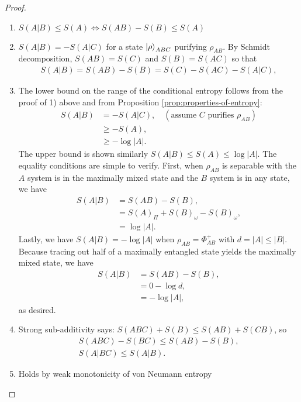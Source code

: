 \documentclass[notoc]{tufte-book}
\begin{document}
\begin{proof}
\begin{enumerate}
    \item $S(A|B) \leq S(A) \Leftrightarrow S(AB)-S(B)\leq S(A) $
    \item $S(A|B) =-S(A|C)$ for a state $\ket{\rho}_{ABC}$ purifying $\rho_{AB}$. By Schmidt decomposition, $S(AB)=S(C)$ and $S(B)=S(AC)$ so that 
    \begin{align}
        S(A|B) =S(AB)-S(B) =S(C)-S(AC)-S(A|C),
    \end{align}
    \item The lower bound on the range of the conditional entropy follows from the proof of 1) above and from Proposition \ref{prop:properties-of-entropy}:
    \begin{align}
        S(A|B) &= - S(A|C), \quad (\text{assume $C$ purifies $\rho_{AB}$})\\
        &\geq -S(A),\\
        &\geq -\log{|A|}.
    \end{align}
    The upper bound is shown similarly $S(A|B)\leq S(A) \leq \log{|A|}.$ The equality conditions are simple to verify. First, when $\rho_{AB}$ is separable with the $A$ system is in the maximally mixed state and the $B$ system is in any state, we have
    \begin{align}
        S(A|B)&=S(AB)-S(B),\\
        &=S(A)_{\Pi} +S(B)_{\omega} -S(B)_{\omega},\\
        &=\log{|A|}.
    \end{align}
    Lastly, we have $S(A|B)=-\log{|A|}$ when $\rho_{AB}=\Phi^+_{AB}$ with $d=|A|\leq|B|$. Because tracing out half of a maximally entangled state yields the maximally mixed state, we have 
    \begin{align}
        S(A|B)&=S(AB)-S(B),\\
        &=0-\log{d},\\
        &=-\log{|A|},
    \end{align}
    as desired.
    \item Strong sub-additivity says:
    $S(ABC)+S(B)\leq S(AB)+S(CB)$, so
    \begin{align}
        S(ABC) -S(BC) \leq S(AB)-S(B),\\
        S(A|BC) \leq S(A|B).
    \end{align}
    \item Holds by weak monotonicity of von Neumann entropy

\end{enumerate}
\end{proof}
\end{document}
